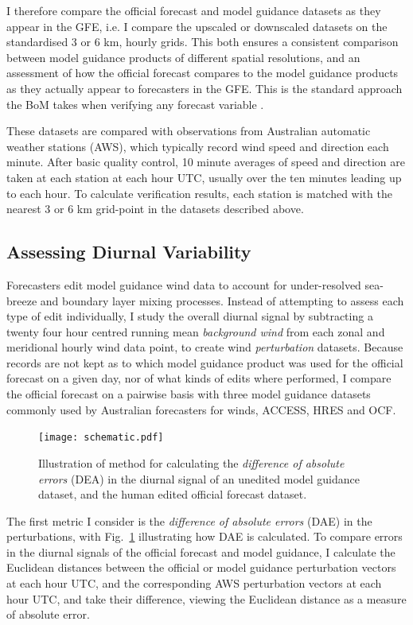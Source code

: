 \documentclass[twocol]{ametsoc}
\begin{document}
I therefore compare the official forecast and model guidance datasets as they appear in the GFE, i.e. I compare the upscaled or downscaled datasets on the standardised 3 or 6 km, hourly grids. This both ensures a consistent comparison between model guidance products of different spatial resolutions, and an assessment of how the official forecast compares to the model guidance products as they actually appear to forecasters in the GFE. This is the standard approach the BoM takes when verifying any forecast variable \citep[e.g.][]{griffiths17}.

These datasets are compared with observations from Australian automatic weather stations (AWS), which typically record wind speed and direction each minute. After basic quality control, 10 minute averages of speed and direction are taken at each station at each hour UTC, usually over the ten minutes leading up to each hour. To calculate verification results, each station is matched with the nearest 3 or 6 km grid-point in the datasets described above.

\subsection{Assessing Diurnal Variability}
Forecasters edit model guidance wind data to account for under-resolved sea-breeze and boundary layer mixing processes. Instead of attempting to assess each type of edit individually, I study the overall diurnal signal by subtracting a twenty four hour centred running mean \textit{background wind} from each zonal and meridional hourly wind data point, to create wind \emph{perturbation} datasets. Because records are not kept as to which model guidance product was used for the official forecast on a given day, nor of what kinds of edits where performed, I compare the official forecast on a pairwise basis with three model guidance datasets commonly used by Australian forecasters for winds, ACCESS, HRES and OCF.

\begin{figure}
\centering
\texttt{[image: schematic.pdf]}
\caption{Illustration of method for calculating the \textit{difference of absolute errors} (DEA) in the diurnal signal of an unedited model guidance dataset, and the human edited official forecast dataset.}
\label{Fig:schematic}
\end{figure}

The first metric I consider is the \textit{difference of absolute errors} (DAE) in the perturbations, with Fig.~\ref{Fig:schematic} illustrating how DAE is calculated. To compare errors in the diurnal signals of the official forecast and model guidance, I calculate the Euclidean distances between the official or model guidance perturbation vectors at each hour UTC, and the corresponding AWS perturbation vectors at each hour UTC, and take their difference, viewing the Euclidean distance as a measure of absolute error.
\end{document}

